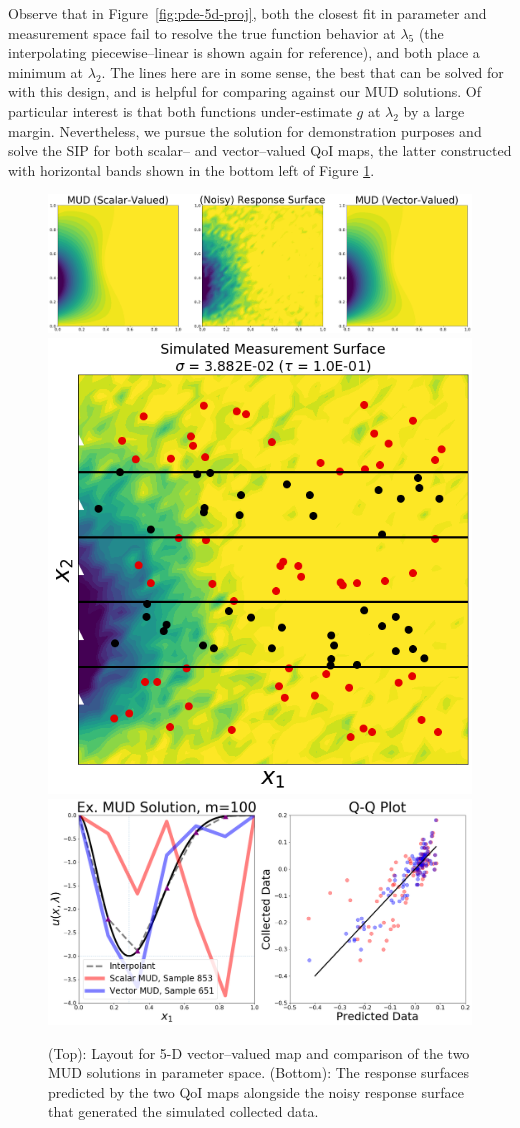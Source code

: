 Observe that in Figure~\ref{fig:pde-5d-proj}, both the closest fit in parameter and measurement space fail to resolve the true function behavior at $\lambda_5$ (the interpolating piecewise--linear is shown again for reference), and both place a minimum at $\lambda_2$.
The lines here are in some sense, the best that can be solved for with this design, and is helpful for comparing against our MUD solutions.
Of particular interest is that both functions under-estimate $g$ at $\lambda_2$ by a large margin.
Nevertheless, we pursue the solution for demonstration purposes and solve the SIP for both scalar-- and vector--valued QoI maps, the latter constructed with horizontal bands shown in the bottom left of Figure \ref{fig:pde-highd-5d-example}.

\begin{figure}[htbp]
\centering
  \includegraphics[width=0.95\linewidth]{figures/pde-highd/pde-highd_surf_exmud_D5_m100}
  \includegraphics[width=0.35\linewidth]{figures/pde-highd/pde-highd_sensors_D5}
  \includegraphics[width=0.6\linewidth]{figures/pde-highd/pde-highd_comp_exmud_D5_m100}
\caption{
(Top): Layout for 5-D vector--valued map and comparison of the two MUD solutions in parameter space.
(Bottom): The response surfaces predicted by the two QoI maps alongside the noisy response surface that generated the simulated collected data.
}
\label{fig:pde-highd-5d-example}
\end{figure}

